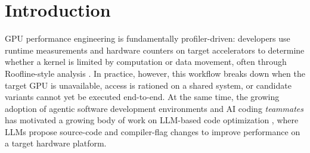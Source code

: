 %
%
%

\newcommand{\rai}[0]{RAI\xspace}

\section{Introduction}
\label{sec:introduction}

GPU performance engineering is fundamentally profiler-driven: developers use runtime measurements and hardware counters on target accelerators to determine whether a kernel is limited by computation or data movement, often through Roofline-style analysis \cite{samuelwilliamsRooflineInsightfulVisual2009}. 
In practice, however, this workflow breaks down when the target GPU is unavailable, access is rationed on a shared system, or candidate variants cannot yet be executed end-to-end. 
At the same time, the growing adoption of agentic software development environments and AI coding \textit{teammates} \cite{liRiseAITeammates2025} has motivated a growing body of work on LLM-based code optimization \cite{gongLanguageModelsCode2025}, where LLMs propose source-code and compiler-flag changes to improve performance on a target hardware platform.



